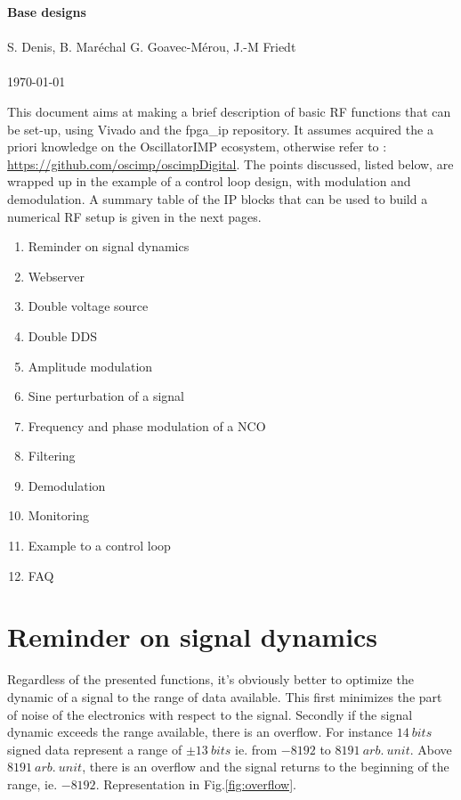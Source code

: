 \documentclass[12pt,oneside]{article}
\begin{document}
\begin{center}
{\bf \Large Base designs} \\ \ \\
S. Denis, B. Maréchal G. Goavec-M\'erou, J.-M Friedt \\ \ \\ \today
\end{center}

This document aims at making a brief description of basic RF functions that can be set-up, using Vivado and the fpga\_ip repository. It assumes acquired the a priori knowledge on the OscillatorIMP ecosystem, otherwise refer to : \href{[https://github.com/oscimp/oscimpDigital]}{https://github.com/oscimp/oscimpDigital}.
The points discussed, listed below, are wrapped up in the example of a control loop design, with modulation and demodulation. A summary table of the IP blocks that can be used to build a numerical RF setup is given in the next pages. 

\begin{multicols}{2}
\begin{enumerate}
\setlength\itemsep{-0.1cm}
\item Reminder on signal dynamics
\item Webserver
\item Double voltage source
\item Double DDS
\item Amplitude modulation
\item Sine perturbation of a signal
\item Frequency and phase modulation of a NCO
\item Filtering
\item Demodulation
\item Monitoring
\item Example to a control loop
\item FAQ
\end{enumerate}
\end{multicols}


\section{Reminder on signal dynamics}\label{sect:reminder}

Regardless of the presented functions, it's obviously better to optimize the dynamic of a signal to the range of data available. This first minimizes the part of noise of the electronics with respect to the signal. Secondly if the signal dynamic exceeds the range available, there is an overflow. For instance $14~bits$ signed data represent a range of $\pm 13~bits$ ie. from $-8192$ to $8191~arb.~unit$. Above $8191~arb.~unit$, there is an overflow and the signal returns to the beginning of the range, ie. $-8192$. Representation in Fig.\ref{fig:overflow}.
\end{document}

